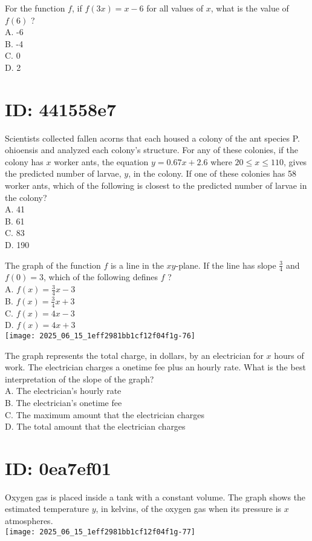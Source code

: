 For the function $f$, if $f(3 x)=x-6$ for all values of $x$, what is the value of $f(6)$ ?\\
A. -6\\
B. -4\\
C. 0\\
D. 2

\section*{ID: 441558e7}
Scientists collected fallen acorns that each housed a colony of the ant species P. ohioensis and analyzed each colony's structure. For any of these colonies, if the colony has $x$ worker ants, the equation $y=0.67 x+2.6$ where $20 \leq x \leq 110$, gives the predicted number of larvae, $y$, in the colony. If one of these colonies has 58 worker ants, which of the following is closest to the predicted number of larvae in the colony?\\
A. 41\\
B. 61\\
C. 83\\
D. 190

The graph of the function $f$ is a line in the $x y$-plane. If the line has slope $\frac{3}{4}$ and $f(0)=3$, which of the following defines $f$ ?\\
A. $f(x)=\frac{3}{4} x-3$\\
B. $f(x)=\frac{3}{4} x+3$\\
C. $f(x)=4 x-3$\\
D. $f(x)=4 x+3$\\
\texttt{[image: 2025\_06\_15\_1eff2981bb1cf12f04f1g-76]}

The graph represents the total charge, in dollars, by an electrician for $x$ hours of work. The electrician charges a onetime fee plus an hourly rate. What is the best interpretation of the slope of the graph?\\
A. The electrician's hourly rate\\
B. The electrician's onetime fee\\
C. The maximum amount that the electrician charges\\
D. The total amount that the electrician charges

\section*{ID: 0ea7ef01}
Oxygen gas is placed inside a tank with a constant volume. The graph shows the estimated temperature $y$, in kelvins, of the oxygen gas when its pressure is $x$ atmospheres.\\
\texttt{[image: 2025\_06\_15\_1eff2981bb1cf12f04f1g-77]}


